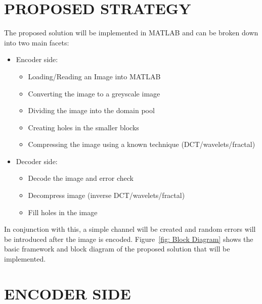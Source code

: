 \documentclass[10pt,twocolumn, a4paper]{witseiepaper}
\begin{document}
%
\section{PROPOSED STRATEGY}
\label{sec: Proposed Strategy}
The proposed solution will be implemented in MATLAB and can be broken down into two main facets:
\begin{itemize}
\item Encoder side:
\begin{itemize}
	\item Loading/Reading an Image into MATLAB
	\item Converting the image to a greyscale image
	\item Dividing the image into the domain pool
	\item Creating holes in the smaller blocks
	\item Compressing the image using a known technique (DCT/wavelets/fractal)
\end{itemize}
\item Decoder side:
\begin{itemize}
	\item Decode the image and error check
	\item Decompress image (inverse DCT/wavelets/fractal)
	\item Fill holes in the image
\end{itemize}
\end{itemize}
In conjunction with this, a simple channel will be created and random errors will be introduced after the image is encoded. Figure~\ref{fig: Block Diagram} shows the basic framework and block diagram of the proposed solution that will be implemented.

\section{ENCODER SIDE}
\label{sec: Encoder Side}
\end{document}
